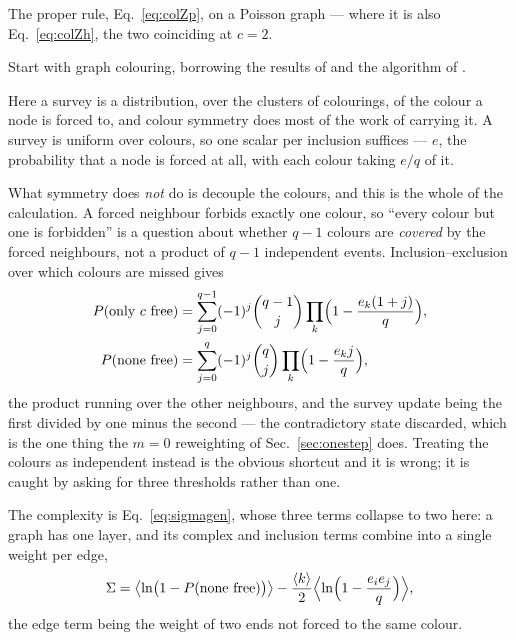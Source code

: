 The proper rule, Eq.~\eqref{eq:colZp}, on a Poisson graph --- where it is also
Eq.~\eqref{eq:colZh}, the two coinciding at $c=2$.

Start with graph colouring, borrowing the results of \citet{mulet2002} and the
algorithm of \citet{braunstein2003}.

Here a survey is a distribution, over the clusters of colourings, of the colour
a node is forced to, and colour symmetry does most of the work of carrying it. A survey is uniform over colours, so one scalar per
inclusion suffices --- $e$, the probability that a node is forced at all, with
each colour taking $e/q$ of it.

What symmetry does \emph{not} do is decouple the colours, and this is the whole
of the calculation. A forced neighbour forbids exactly one colour, so ``every
colour but one is forbidden'' is a question about whether $q-1$ colours are
\emph{covered} by the forced neighbours, not a product of $q-1$ independent
events. Inclusion--exclusion over which colours are missed gives
\begin{equation}
  \begin{split}
    P(\text{only }c\text{ free})&=\sum_{j=0}^{q-1}(-1)^{j}\binom{q-1}{j}
      \prod_{k}\Bigl(1-\frac{e_{k}(1+j)}{q}\Bigr),\\
    P(\text{none free})&=\sum_{j=0}^{q}(-1)^{j}\binom{q}{j}
      \prod_{k}\Bigl(1-\frac{e_{k}j}{q}\Bigr),
  \end{split}
  \label{eq:colsp}
\end{equation}
the product running over the other neighbours, and the survey update being the
first divided by one minus the second --- the contradictory state discarded,
which is the one thing the $m=0$ reweighting of Sec.~\ref{sec:onestep} does. Treating the colours as independent instead is the
obvious shortcut and it is wrong; it is caught by asking for three thresholds
rather than one.

The complexity is Eq.~\eqref{eq:sigmagen}, whose three terms collapse to two
here: a graph has one layer, and its complex and inclusion terms combine into a
single weight per edge,
\begin{equation}
  \Sigma=\bigl\langle\ln\bigl(1-P(\text{none free})\bigr)\bigr\rangle
        -\frac{\langle k \rangle}{2}\Bigl\langle\ln\Bigl(1-\frac{e_{i}e_{j}}{q}\Bigr)
        \Bigr\rangle,
  \label{eq:colsigma}
\end{equation}
the edge term being the weight of two ends not forced to the same colour.


